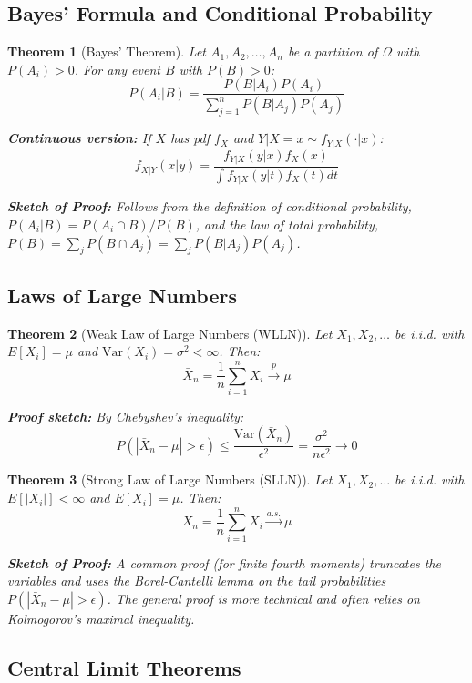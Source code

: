 \documentclass[12pt,a4paper]{article}
\newtheorem{theorem}{Theorem}[section]
\theoremstyle{remark}
\begin{document}
\subsection{Bayes' Formula and Conditional Probability}

\begin{theorem}[Bayes' Theorem]
Let $A_1, A_2, \ldots, A_n$ be a partition of $\Omega$ with $P(A_i) > 0$. For any event $B$ with $P(B) > 0$:
$$P(A_i|B) = \frac{P(B|A_i)P(A_i)}{\sum_{j=1}^n P(B|A_j)P(A_j)}$$

\textbf{Continuous version:} If $X$ has pdf $f_X$ and $Y|X=x \sim f_{Y|X}(\cdot|x)$:
$$f_{X|Y}(x|y) = \frac{f_{Y|X}(y|x)f_X(x)}{\int f_{Y|X}(y|t)f_X(t)dt}$$

\textbf{Sketch of Proof:} Follows from the definition of conditional probability, $P(A_i|B) = P(A_i \cap B)/P(B)$, and the law of total probability, $P(B) = \sum_j P(B \cap A_j) = \sum_j P(B|A_j)P(A_j)$.
\end{theorem}

\subsection{Laws of Large Numbers}

\begin{theorem}[Weak Law of Large Numbers (WLLN)]
Let $X_1, X_2, \ldots$ be i.i.d. with $E[X_i] = \mu$ and $\text{Var}(X_i) = \sigma^2 < \infty$. Then:
$$\bar{X}_n = \frac{1}{n}\sum_{i=1}^n X_i \stackrel{p}{\to} \mu$$

\textbf{Proof sketch:} By Chebyshev's inequality:
$$P(|\bar{X}_n - \mu| > \epsilon) \leq \frac{\text{Var}(\bar{X}_n)}{\epsilon^2} = \frac{\sigma^2}{n\epsilon^2} \to 0$$
\end{theorem}

\begin{theorem}[Strong Law of Large Numbers (SLLN)]
Let $X_1, X_2, \ldots$ be i.i.d. with $E[|X_i|] < \infty$ and $E[X_i] = \mu$. Then:
$$\bar{X}_n = \frac{1}{n}\sum_{i=1}^n X_i \stackrel{a.s.}{\to} \mu$$

\textbf{Sketch of Proof:} A common proof (for finite fourth moments) truncates the variables and uses the Borel-Cantelli lemma on the tail probabilities $P(|\bar{X}_n - \mu| > \epsilon)$. The general proof is more technical and often relies on Kolmogorov's maximal inequality.
\end{theorem}

\subsection{Central Limit Theorems}
\end{document}
